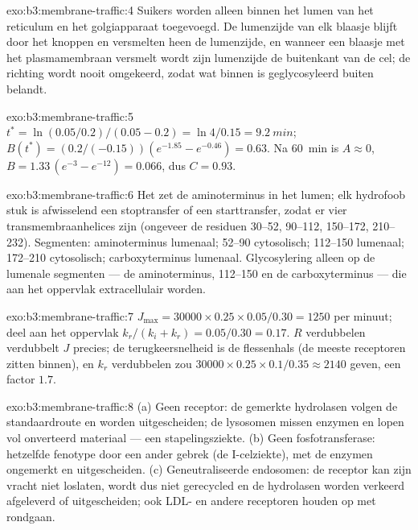 \begin{solution}{exo:b3:membrane-traffic:4}
Suikers worden alleen binnen het lumen van het reticulum en het
golgiapparaat toegevoegd. De lumenzijde van elk blaasje blijft door het
knoppen en versmelten heen de lumenzijde, en wanneer een blaasje met het
plasmamembraan versmelt wordt zijn lumenzijde de buitenkant van de cel;
de richting wordt nooit omgekeerd, zodat wat binnen is geglycosyleerd
buiten belandt.
\end{solution}

\begin{solution}{exo:b3:membrane-traffic:5}
$t^{*} = \ln(0.05/0.2)/(0.05 - 0.2) = \ln 4/0.15 = \qty{9.2}{min}$;
$B(t^{*}) = (0.2/(-0.15))(e^{-1.85} - e^{-0.46}) = 0.63$. Na \qty{60}{min}
is $A \approx 0$, $B = 1.33\,(e^{-3} - e^{-12}) = 0.066$, dus $C = 0.93$.
\end{solution}

\begin{solution}{exo:b3:membrane-traffic:6}
Het  zet de aminoterminus in het lumen; elk hydrofoob
stuk is afwisselend een stoptransfer of een starttransfer, zodat er
vier transmembraanhelices zijn (ongeveer de residuen 30--52,
90--112, 150--172, 210--232). Segmenten: aminoterminus lumenaal;
52--90 cytosolisch; 112--150 lumenaal; 172--210 cytosolisch;
carboxyterminus lumenaal. Glycosylering alleen op de lumenale segmenten
--- de aminoterminus, 112--150 en de carboxyterminus --- die aan het
oppervlak extracellulair worden.
\end{solution}

\begin{solution}{exo:b3:membrane-traffic:7}
$J_{\max} = \num{30000}\times 0.25\times 0.05/0.30 = 1250$ per minuut;
deel aan het oppervlak $k_{r}/(k_{i} + k_{r}) = 0.05/0.30 = 0.17$. $R$
verdubbelen verdubbelt $J$ precies; de terugkeersnelheid is de
flessenhals (de meeste receptoren zitten binnen), en $k_{r}$ verdubbelen
zou $\num{30000}\times 0.25
\times 0.1/0.35 \approx 2140$ geven, een factor $1.7$.
\end{solution}

\begin{solution}{exo:b3:membrane-traffic:8}
(a) Geen receptor: de gemerkte hydrolasen volgen de standaardroute en
worden uitgescheiden; de lysosomen missen enzymen en lopen vol
onverteerd materiaal --- een stapelingsziekte. (b) Geen
fosfotransferase: hetzelfde fenotype door een ander gebrek (de
I-celziekte), met de enzymen ongemerkt en uitgescheiden. (c)
Geneutraliseerde endosomen: de receptor kan zijn vracht niet loslaten,
wordt dus niet gerecycled en de hydrolasen worden verkeerd afgeleverd
of uitgescheiden; ook LDL- en andere receptoren houden op met rondgaan.
\end{solution}

